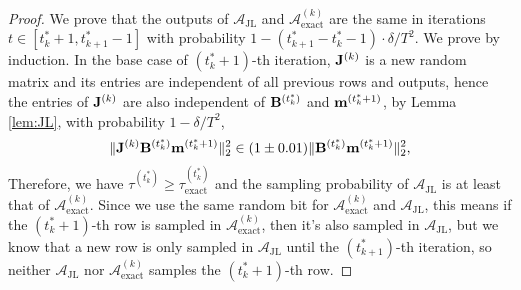 \begin{proof}
We prove that the outputs of $\mathcal{A}_{\text{JL}}$ and $\mathcal{A}_{\text{exact}}^{(k)}$ are the same in iterations $t \in [t^*_k+1, t^*_{k+1}-1]$ with probability $1 - (t^*_{k+1}-t^*_k-1) \cdot \delta/T^2$. 
We prove by induction. In the base case of $(t^*_k+1)$-th iteration, $\mathbf{J}^{(k)}$ is a new random matrix and its entries are independent of all previous rows and outputs, hence the entries of $\mathbf{J}^{(k)}$ are also independent of $\mathbf{B}^{(t^*_k)}$ and $\mathbf{m}^{(t^*_k+1)}$, 
by Lemma \ref{lem:JL}, with probability $1 - \delta/T^2$, 
\[
 \|\mathbf{J}^{(k)} \mathbf{B}^{(t^*_k)} \mathbf{m}^{(t^*_k+1)}\|_2^2 \in (1\pm 0.01) \|\mathbf{B}^{(t^*_k)} \mathbf{m}^{(t^*_k+1)}\|_2^2, 
\]
Therefore, we have $\tau^{(t_k^*)} \geq \tau^{(t_k^{*})}_{\text{exact}}$ and the sampling probability of $\mathcal{A}_{\text{JL}}$ is at least that of $\mathcal{A}_{\text{exact}}^{(k)}$. Since we use the same random bit for $\mathcal{A}_{\text{exact}}^{(k)}$ and $\mathcal{A}_{\text{JL}}$, this means if the $(t^*_k+1)$-th row is sampled in $\mathcal{A}_{\text{exact}}^{(k)}$, then it's also sampled in $\mathcal{A}_{\text{JL}}$, but we know that a new row is only sampled in $\mathcal{A}_{\text{JL}}$ until the $(t^*_{k+1})$-th iteration, so neither $\mathcal{A}_{\text{JL}}$ nor $\mathcal{A}_{\text{exact}}^{(k)}$ samples the $(t^*_k+1)$-th row. 


\end{proof}
